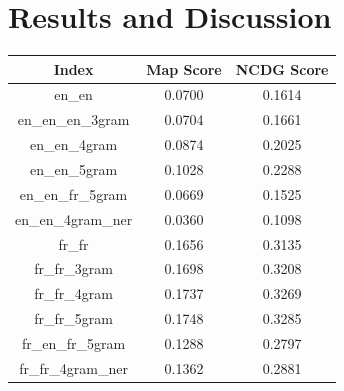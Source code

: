 \section{Results and Discussion}
\label{sec:results}


\begin{center}
    \begin{tabular}{ |c||c|c| } 
        \hline
        \textbf{Index} & \textbf{Map Score} & \textbf{NCDG Score}\\
        \hline\hline
        en\_en & 0.0700 & 0.1614 \\
        \hline
        en\_en\_en\_3gram & 0.0704 & 0.1661 \\
        \hline
        en\_en\_4gram & 0.0874 & 0.2025 \\
        \hline
        en\_en\_5gram & 0.1028 & 0.2288 \\
        \hline
        en\_en\_fr\_5gram & 0.0669 & 0.1525 \\
        \hline
        en\_en\_4gram\_ner & 0.0360 & 0.1098 \\
        \hline
        fr\_fr & 0.1656 & 0.3135 \\
        \hline
        fr\_fr\_3gram & 0.1698 & 0.3208 \\
        \hline
        fr\_fr\_4gram & 0.1737 & 0.3269 \\
        \hline
        fr\_fr\_5gram & 0.1748 & 0.3285 \\
        \hline
        fr\_en\_fr\_5gram & 0.1288 & 0.2797 \\
        \hline
        fr\_fr\_4gram\_ner & 0.1362 & 0.2881 \\
        \hline
    \end{tabular}
\end{center}

